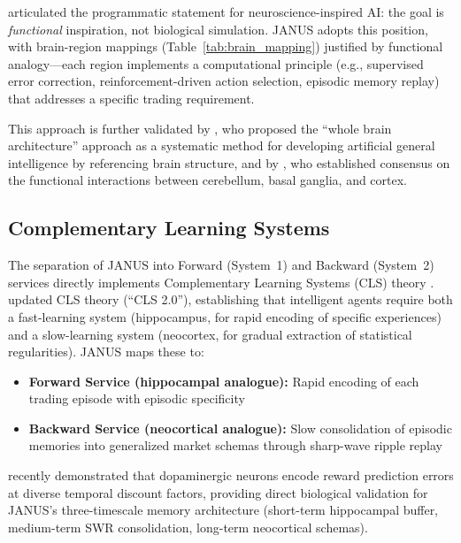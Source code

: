 \documentclass[12pt, a4paper]{article}
\begin{document}
\citet{hassabis2017neuroscience} articulated the programmatic statement for neuroscience-inspired AI: the goal is \textit{functional} inspiration, not biological simulation. JANUS adopts this position, with brain-region mappings (Table~\ref{tab:brain_mapping}) justified by functional analogy---each region implements a computational principle (e.g., supervised error correction, reinforcement-driven action selection, episodic memory replay) that addresses a specific trading requirement.

This approach is further validated by \citet{yamakawa2021whole}, who proposed the ``whole brain architecture'' approach as a systematic method for developing artificial general intelligence by referencing brain structure, and by \citet{caligiore2017consensus}, who established consensus on the functional interactions between cerebellum, basal ganglia, and cortex.

\subsection{Complementary Learning Systems}
\label{sec:rw_cls}

The separation of JANUS into Forward (System~1) and Backward (System~2) services directly implements Complementary Learning Systems (CLS) theory \citep{mcclelland1995complementary}. \citet{kumaran2016cls} updated CLS theory (``CLS 2.0''), establishing that intelligent agents require both a fast-learning system (hippocampus, for rapid encoding of specific experiences) and a slow-learning system (neocortex, for gradual extraction of statistical regularities). JANUS maps these to:

\begin{itemize}
	\item \textbf{Forward Service (hippocampal analogue):} Rapid encoding of each trading episode with episodic specificity
	\item \textbf{Backward Service (neocortical analogue):} Slow consolidation of episodic memories into generalized market schemas through sharp-wave ripple replay \citep{wilson1994replay, buzsaki2015hippocampal}
\end{itemize}

\citet{masset2025multitimescale} recently demonstrated that dopaminergic neurons encode reward prediction errors at diverse temporal discount factors, providing direct biological validation for JANUS's three-timescale memory architecture (short-term hippocampal buffer, medium-term SWR consolidation, long-term neocortical schemas).
\end{document}
